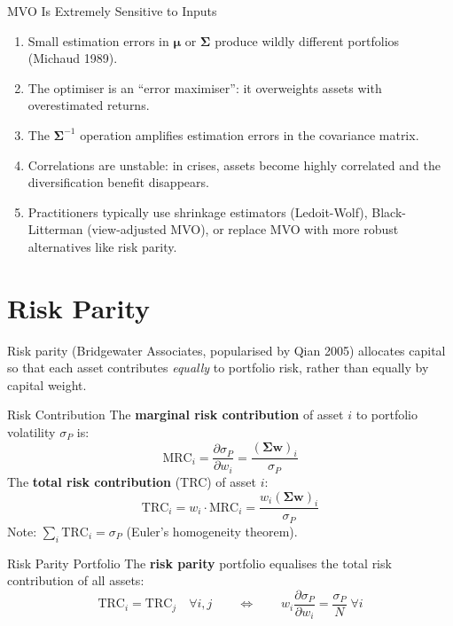 \documentclass[12pt,a4paper,openany]{report}
\theoremstyle{definition}
\begin{document}
\begin{warningbox}{MVO Is Extremely Sensitive to Inputs}
\begin{enumerate}[label=\arabic*.]
  \item Small estimation errors in $\boldsymbol{\mu}$ or $\boldsymbol{\Sigma}$ produce wildly different portfolios (Michaud 1989).
  \item The optimiser is an ``error maximiser'': it overweights assets with overestimated returns.
  \item The $\boldsymbol{\Sigma}^{-1}$ operation amplifies estimation errors in the covariance matrix.
  \item Correlations are unstable: in crises, assets become highly correlated and the diversification benefit disappears.
  \item Practitioners typically use shrinkage estimators (Ledoit-Wolf), Black-Litterman (view-adjusted MVO), or replace MVO with more robust alternatives like risk parity.
\end{enumerate}
\end{warningbox}

\section{Risk Parity}

Risk parity (Bridgewater Associates, popularised by Qian 2005) allocates capital so that each asset contributes \emph{equally} to portfolio risk, rather than equally by capital weight.

\begin{definitionbox}{Risk Contribution}
The \textbf{marginal risk contribution} of asset $i$ to portfolio volatility $\sigma_P$ is:
\[
  \text{MRC}_i = \frac{\partial \sigma_P}{\partial w_i} = \frac{(\boldsymbol{\Sigma}\mathbf{w})_i}{\sigma_P}
\]
The \textbf{total risk contribution} (TRC) of asset $i$:
\[
  \text{TRC}_i = w_i \cdot \text{MRC}_i = \frac{w_i (\boldsymbol{\Sigma}\mathbf{w})_i}{\sigma_P}
\]
Note: $\sum_i \text{TRC}_i = \sigma_P$ (Euler's homogeneity theorem).
\end{definitionbox}

\begin{definitionbox}{Risk Parity Portfolio}
The \textbf{risk parity} portfolio equalises the total risk contribution of all assets:
\[
  \text{TRC}_i = \text{TRC}_j \quad \forall i, j \qquad \Longleftrightarrow \qquad w_i \frac{\partial \sigma_P}{\partial w_i} = \frac{\sigma_P}{N} \; \forall i
\]
\end{definitionbox}
\end{document}
